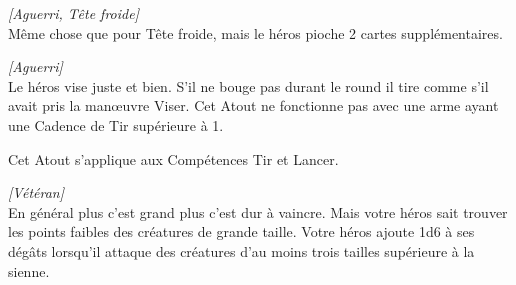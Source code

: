 \begin{description}[align=left]
    \item [Sang-froid]
    	\emph{[Aguerri, Tête froide]}\\
        Même chose que pour Tête froide, mais le héros pioche 2 cartes supplémentaires.

    \item [Tireur d’élite]
    	\emph{[Aguerri]}\\
        Le héros vise juste et bien. S’il ne bouge pas durant le round il tire comme s’il avait pris la man\oe{uvre} Viser. Cet Atout ne fonctionne pas avec une arme ayant une Cadence de Tir supérieure à 1.
		
		Cet Atout s’applique aux Compétences Tir et Lancer.

    \item [Tueur de géant]
    	\emph{[Vétéran]}\\
        En général plus c’est grand plus c’est dur à vaincre. Mais votre héros sait trouver les points faibles des créatures de grande taille. Votre héros ajoute 1d6 à ses dégâts lorsqu’il attaque des créatures d’au moins trois tailles supérieure à la sienne.
\end{description}

